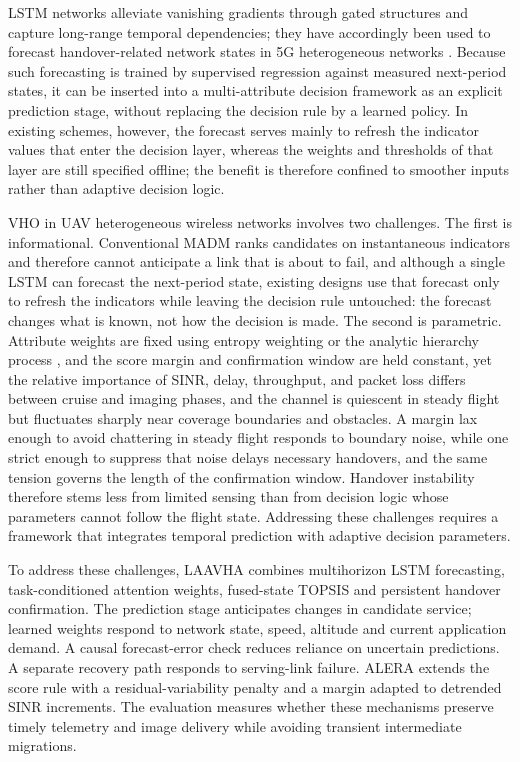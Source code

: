 \documentclass[preprint,12pt]{elsarticle}
\begin{document}
LSTM networks alleviate vanishing gradients through gated structures \cite{ref19} and capture long-range temporal dependencies; they have accordingly been used to forecast handover-related network states in 5G heterogeneous networks \cite{ref20,ref21,ref22}. Because such forecasting is trained by supervised regression against measured next-period states, it can be inserted into a multi-attribute decision framework as an explicit prediction stage, without replacing the decision rule by a learned policy. In existing schemes, however, the forecast serves mainly to refresh the indicator values that enter the decision layer, whereas the weights and thresholds of that layer are still specified offline; the benefit is therefore confined to smoother inputs rather than adaptive decision logic.

VHO in UAV heterogeneous wireless networks involves two challenges. The first is informational. Conventional MADM ranks candidates on instantaneous indicators and therefore cannot anticipate a link that is about to fail, and although a single LSTM can forecast the next-period state, existing designs use that forecast only to refresh the indicators while leaving the decision rule untouched: the forecast changes what is known, not how the decision is made. The second is parametric. Attribute weights are fixed using entropy weighting or the analytic hierarchy process \cite{ref12,ref13,ref14,ref15}, and the score margin and confirmation window are held constant, yet the relative importance of SINR, delay, throughput, and packet loss differs between cruise and imaging phases, and the channel is quiescent in steady flight but fluctuates sharply near coverage boundaries and obstacles. A margin lax enough to avoid chattering in steady flight responds to boundary noise, while one strict enough to suppress that noise delays necessary handovers, and the same tension governs the length of the confirmation window. Handover instability therefore stems less from limited sensing than from decision logic whose parameters cannot follow the flight state. Addressing these challenges requires a framework that integrates temporal prediction with adaptive decision parameters.

To address these challenges, LAAVHA combines multihorizon LSTM forecasting, task-conditioned attention weights, fused-state TOPSIS and persistent handover confirmation. The prediction stage anticipates changes in candidate service; learned weights respond to network state, speed, altitude and current application demand. A causal forecast-error check reduces reliance on uncertain predictions. A separate recovery path responds to serving-link failure. ALERA extends the score rule with a residual-variability penalty and a margin adapted to detrended SINR increments. The evaluation measures whether these mechanisms preserve timely telemetry and image delivery while avoiding transient intermediate migrations.
\end{document}
